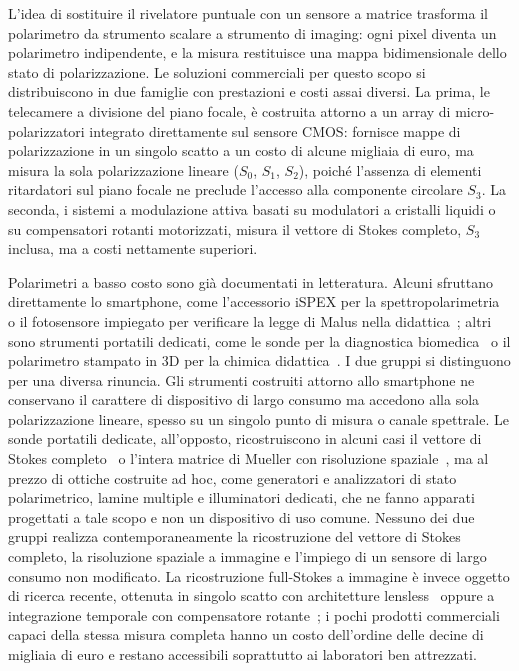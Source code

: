 L'idea di sostituire il rivelatore puntuale con un sensore a matrice trasforma il polarimetro da strumento scalare a strumento di imaging: ogni pixel diventa un polarimetro indipendente, e la misura restituisce una mappa bidimensionale dello stato di polarizzazione. Le soluzioni commerciali per questo scopo si distribuiscono in due famiglie con prestazioni e costi assai diversi. La prima, le telecamere a divisione del piano focale, è costruita attorno a un array di micro-polarizzatori integrato direttamente sul sensore CMOS: fornisce mappe di polarizzazione in un singolo scatto a un costo di alcune migliaia di euro, ma misura la sola polarizzazione lineare ($S_0$, $S_1$, $S_2$), poiché l'assenza di elementi ritardatori sul piano focale ne preclude l'accesso alla componente circolare $S_3$. %
La seconda, i sistemi a modulazione attiva basati su modulatori a cristalli liquidi o su compensatori rotanti motorizzati, misura il vettore di Stokes completo, $S_3$ inclusa, ma a costi nettamente superiori.

Polarimetri a basso costo sono già documentati in letteratura. Alcuni sfruttano direttamente lo smartphone, come l'accessorio iSPEX per la spettropolarimetria~\cite{Burggraaff2020ispex} o il fotosensore impiegato per verificare la legge di Malus nella didattica~\cite{Gallitto2024malus}; altri sono strumenti portatili dedicati, come le sonde per la diagnostica biomedica~\cite{Gonzalez2020colposcope,Louie2021skin} o il polarimetro stampato in 3D per la chimica didattica~\cite{Bernard2020polarimeter}. I due gruppi si distinguono per una diversa rinuncia. Gli strumenti costruiti attorno allo smartphone ne conservano il carattere di dispositivo di largo consumo ma accedono alla sola polarizzazione lineare, spesso su un singolo punto di misura o canale spettrale. Le sonde portatili dedicate, all'opposto, ricostruiscono in alcuni casi il vettore di Stokes completo~\cite{Louie2021skin} o l'intera matrice di Mueller con risoluzione spaziale~\cite{Gonzalez2020colposcope}, ma al prezzo di ottiche costruite ad hoc, come generatori e analizzatori di stato polarimetrico, lamine multiple e illuminatori dedicati, che ne fanno apparati progettati a tale scopo e non un dispositivo di uso comune. Nessuno dei due gruppi realizza contemporaneamente la ricostruzione del vettore di Stokes completo, la risoluzione spaziale a immagine e l'impiego di un sensore di largo consumo non modificato. La ricostruzione full-Stokes a immagine è invece oggetto di ricerca recente, ottenuta in singolo scatto con architetture lensless~\cite{Baek2022lensless} oppure a integrazione temporale con compensatore rotante~\cite{Gu2022fullstokes}; i pochi prodotti commerciali capaci della stessa misura completa hanno un costo dell'ordine delle decine di migliaia di euro e restano accessibili soprattutto ai laboratori ben attrezzati.

